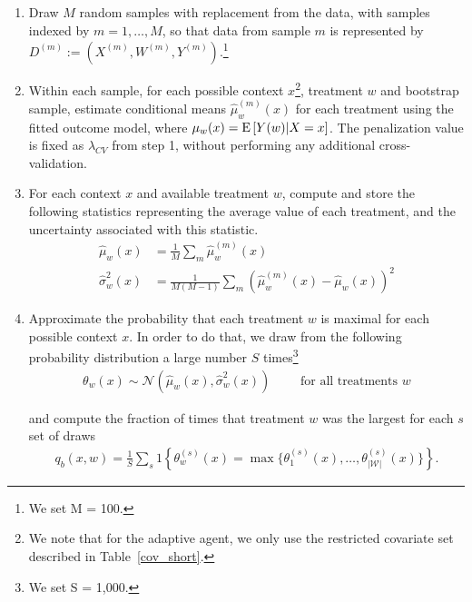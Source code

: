 \documentclass[letterpaper, 12pt, parskip=full,]{scrartcl}
\begin{document}
\begin{enumerate}
\begin{enumerate}
  \item \label{step:draw} Draw $M$ random samples with replacement from the data, with samples indexed by $m = 1, \dots, M$, so that data from sample $m$ is represented by $D^{(m)} := (X^{(m)}, W^{(m)}, Y^{(m)})$.\footnote{We set M = 100.} 

  \item Within each sample, for each possible context $x$\footnote{We note that for the adaptive agent, we only use the restricted covariate set described in Table~\ref{cov_short}. }, treatment $w$ and bootstrap sample, estimate conditional means  $\hat{\mu}_w^{(m)}(x)$ for each treatment using the fitted outcome model, where $\mu_w(x) = {\textrm E}\,[Y(w)|X=x]$. The penalization value is fixed as $\lambda_{CV}$ from step 1, without performing any additional cross-validation.
  
  \item For each context $x$ and available treatment $w$, compute and store the following statistics representing the average value of each treatment, and the uncertainty associated with this statistic.
    \begin{equation}
      \begin{aligned}
        \hat{\mu}_w(x)         &= \frac{1}{M}\sum_{m} \hat{\mu}_w^{(m)}(x) \\
         \hat{\sigma}^{2}_w(x) &= \frac{1}{M(M-1)} \sum_{m} (\hat{\mu}_w^{(m)}(x) - \hat{\mu}_w(x))^2
      \end{aligned}
    \end{equation}

  \item \label{step:prob} Approximate the probability that each treatment $w$ is maximal for each possible context $x$. In order to do that, we draw from the following probability distribution a large number $S$ times\footnote{We set S = 1,000.}
  \begin{align}
    \theta_{w}(x) \sim \mathcal{N}(\hat{\mu}_w(x), \hat{\sigma}_w^{2}(x)) \qquad %
    \text{ for all treatments }w
  \end{align}

  and compute the fraction of times that treatment $w$ was the largest for each $s$ set of draws
  \begin{align}
    q_{b}(x, w) = \frac{1}{S} \sum_{s} 1\left\{ \theta_{w}^{(s)}(x) = \max \{\theta_{1}^{(s)}(x), \dots, \theta_{|\mathcal{W}|}^{(s)}(x) \}  \right\}. 
  \end{align}


\end{enumerate}
\end{enumerate}
\end{document}
